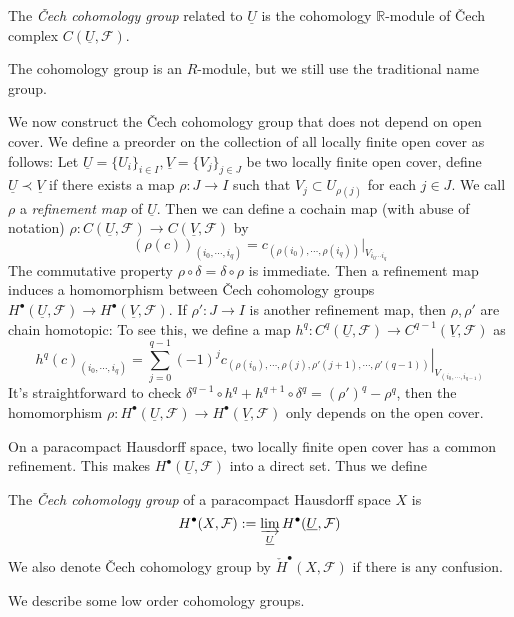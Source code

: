 \begin{defn}
    The \emph{\v{C}ech cohomology group} related to $\underline{U}$ is the cohomology $\mathbb{R}$-module of \v{C}ech complex $C(\underline{U},\mathcal{F})$.
\end{defn}

The cohomology group is an $R$-module, but we still use the traditional name group.

We now construct the \v{C}ech cohomology group that does not depend on open cover.
We define a preorder on the collection of all locally finite open cover as follows:
Let $\underline{U}=\{U_i\}_{i\in I},\underline{V}=\{V_j\}_{j\in J}$ be two locally finite open cover, define $\underline{U}\prec\underline{V}$ if there exists a map $\rho:J\to I$ such that $V_j\subset U_{\rho(j)}$ for each $j\in J$.
We call $\rho$ a \emph{refinement map} of $\underline{U}$.
Then we can define a cochain map (with abuse of notation) $\rho:C(\underline{U},\mathcal{F})\to C(\underline{V},\mathcal{F})$ by
\[(\rho(c))_{(i_0,\cdots,i_q)}=c_{(\rho(i_0),\cdots,\rho(i_q))}|_{V_{i_0\cdots i_q}}\]
The commutative property $\rho\circ\delta=\delta\circ\rho$ is immediate.
Then a refinement map induces a homomorphism between \v{C}ech cohomology groups $H^\bullet(\underline{U},\mathcal{F})\to H^\bullet(\underline{V},\mathcal{F})$.
If $\rho':J\to I$ is another refinement map, then $\rho,\rho'$ are chain homotopic:
To see this, we define a map $h^q:C^q(\underline{U},\mathcal{F})\to C^{q-1}(\underline{V},\mathcal{F})$ as
\[h^q(c)_{(i_0,\cdots,i_q)}=\sum_{j=0}^{q-1}(-1)^j\left.c_{(\rho(i_0),\cdots,\rho(j),\rho'(j+1),\cdots,\rho'(q-1))}\right|_{V_{(i_0,\cdots,i_{q-1})}}\]
It's straightforward to check $\delta^{q-1}\circ h^q+h^{q+1}\circ\delta^q=(\rho')^q-\rho^q$, then the homomorphism $\rho:H^\bullet(\underline{U},\mathcal{F})\to H^\bullet(\underline{V},\mathcal{F})$ only depends on the open cover.

On a paracompact Hausdorff space, two locally finite open cover has a common refinement.
This makes $H^\bullet(\underline{U},\mathcal{F})$ into a direct set.
Thus we define
\begin{defn}
    The \emph{\v{C}ech cohomology group} of a paracompact Hausdorff space $X$ is 
    \[H^\bullet(X,\mathcal{F}):=\varinjlim_{\underline{U}}H^\bullet(\underline{U},\mathcal{F})\]
    We also denote \v{C}ech cohomology group by $\check{H}^\bullet(X,\mathcal{F})$ if there is any confusion.
\end{defn}

We describe some low order cohomology groups.

